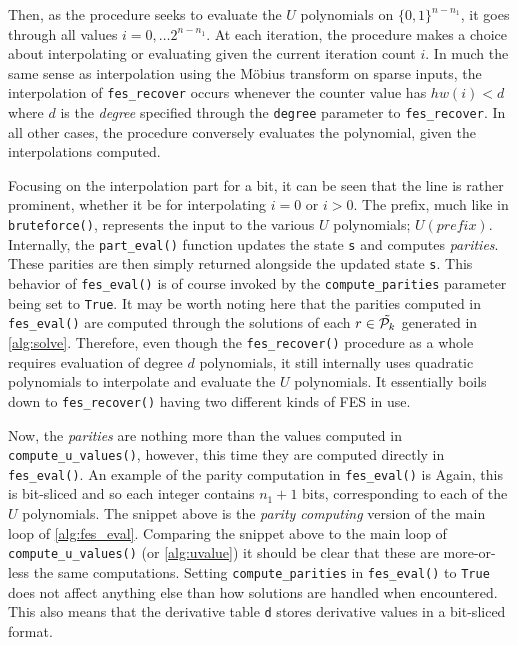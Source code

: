 Then, as the procedure seeks to evaluate the $U$ polynomials on $\{0,1\}^{n - n_1}$, it goes through all values $i = 0, \dots 2^{n - n_1}$. At each iteration, the procedure makes a choice about interpolating or evaluating given the current iteration count $i$. In much the same sense as interpolation using the Möbius transform on sparse inputs, the interpolation of \texttt{fes\_recover} occurs whenever the counter value has $hw(i) < d$ where $d$ is the \textit{degree} specified through the \texttt{degree} parameter to \texttt{fes\_recover}. In all other cases, the procedure conversely evaluates the polynomial, given the interpolations computed.

Focusing on the interpolation part for a bit, it can be seen that the line
is rather prominent, whether it be for interpolating $i = 0$ or $i > 0$. The prefix, much like in \texttt{bruteforce()}, represents the input to the various $U$ polynomials; $U(prefix)$. Internally, the \texttt{part\_eval()} function updates the state \texttt{s} and computes \textit{parities}. These parities are then simply returned alongside the updated state \texttt{s}. This behavior of \texttt{fes\_eval()} is of course invoked by the \texttt{compute\_parities} parameter being set to \texttt{True}. It may be worth noting here that the parities computed in \texttt{fes\_eval()} are computed through the solutions of each $r \in \Tilde{\mathcal{P}_k}$ generated in \cref{alg:solve}. Therefore, even though the \texttt{fes\_recover()} procedure as a whole requires evaluation of degree $d$ polynomials, it still internally uses quadratic polynomials to interpolate and evaluate the $U$ polynomials. It essentially boils down to \texttt{fes\_recover()} having two different kinds of FES in use.

Now, the \textit{parities} are nothing more than the values computed in \texttt{compute\_u\_values()}, however, this time they are computed directly in \texttt{fes\_eval()}. An example of the parity computation in \texttt{fes\_eval()} is 
Again, this is bit-sliced and so each integer contains $n_1 + 1$ bits, corresponding to each of the $U$ polynomials. The snippet above is the \textit{parity computing} version of the main loop of \cref{alg:fes_eval}. Comparing the snippet above to the main loop of \texttt{compute\_u\_values()} (or \cref{alg:uvalue}) it should be clear that these are more-or-less the same computations. Setting \texttt{compute\_parities} in \texttt{fes\_eval()} to \texttt{True} does not affect anything else than how solutions are handled when encountered. This also means that the derivative table \texttt{d} stores derivative values in a bit-sliced format.

